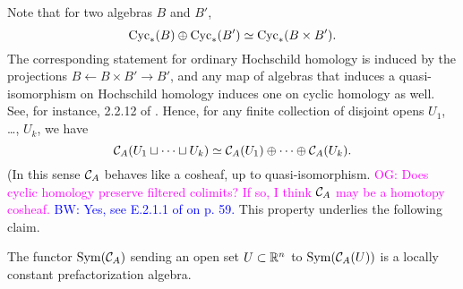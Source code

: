 \documentclass[11pt]{amsart}
\numberwithin{equation}{section}
\def\brian{\textcolor{blue}{BW: }\textcolor{blue}}
\def\owen{\textcolor{magenta}{OG: }\textcolor{magenta}}
\begin{document}
Note that for two algebras $B$ and $B'$,
\[
{\rm Cyc}_*(B) \oplus {\rm Cyc}_*(B') \simeq {\rm Cyc}_*(B \times B') .
\] 
The corresponding statement for ordinary Hochschild homology is induced by the projections $B \leftarrow B \times B' \to B'$, and any map of algebras that induces a quasi-isomorphism on Hochschild homology induces one on cyclic homology as well.
See, for instance, 2.2.12 of \cite{LodayCyclic}. 
Hence, for any finite collection of disjoint opens $U_1$, \dots, $U_k$, 
we have
\[
\mathcal C_A(U_1 \sqcup \cdots \sqcup U_k) \simeq \mathcal C_A(U_1) \oplus \cdots \oplus \mathcal C_A(U_k).
\]
(In this sense $\mathcal C_A$ behaves like a cosheaf, up to quasi-isomorphism. 
\owen{Does cyclic homology preserve filtered colimits? If so, I think $\mathcal C_A$ may be a homotopy cosheaf.}
\brian{Yes, see E.2.1.1 of \cite{LodayCyclic} on p. 59.}
This property underlies the following claim.


\begin{lmm}
\label{lem: cycfact}
The functor ${\rm Sym}(\mathcal C_A)$ sending an open set $U \subset \mathbb R^n$ to ${\rm Sym}(\mathcal C_A(U))$ is a locally constant prefactorization algebra.
\end{lmm}

\end{document}
